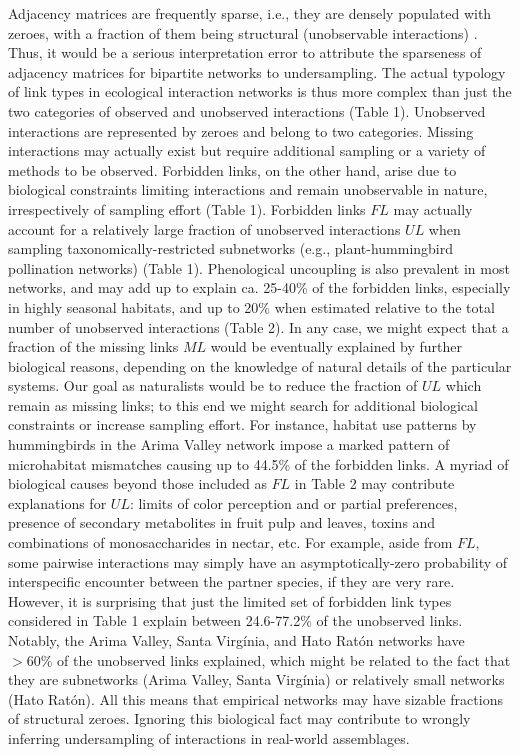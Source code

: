 \documentclass[12pt]{article}
\begin{document}
Adjacency matrices are frequently sparse, i.e., they are densely populated with zeroes, with a fraction of them being structural (unobservable interactions) \citep{Bascompte:2014to}. Thus, it would be a serious interpretation error to attribute the sparseness of adjacency matrices for bipartite networks to undersampling. The actual typology of link types in ecological interaction networks is thus more complex than just the two categories of observed and unobserved interactions (Table 1). Unobserved interactions are represented by zeroes and belong to two categories. Missing interactions may actually exist but require additional sampling or a variety of methods to be observed. Forbidden links, on the other hand, arise due to biological constraints limiting interactions and remain unobservable in nature, irrespectively of sampling effort (Table 1). Forbidden links $FL$ may actually account for a relatively large fraction of unobserved interactions $UL$ when sampling taxonomically-restricted subnetworks (e.g., plant-hummingbird pollination networks) (Table 1). Phenological uncoupling is also prevalent in most networks, and may add up to explain ca. 25-40\% of the forbidden links, especially in highly seasonal habitats, and up to 20\% when estimated relative to the total number of unobserved interactions (Table 2). In any case, we might expect that a fraction of the missing links $ML$ would be eventually explained by further biological reasons, depending on the knowledge of natural details of the particular systems. Our goal as naturalists would be to reduce the fraction of $UL$ which remain as missing links; to this end we might search for additional biological constraints or increase sampling effort. For instance, habitat use patterns by hummingbirds in the Arima Valley network \citep[Table 2; ][]{E31.616} impose a marked pattern of microhabitat mismatches causing up to 44.5\% of the forbidden links. A myriad of biological causes beyond those included as $FL$ in Table 2 may contribute explanations for $UL$: limits of color perception and or partial preferences, presence of secondary metabolites in fruit pulp and leaves, toxins and combinations of monosaccharides in nectar, etc. For example, aside from $FL$, some pairwise interactions may simply have an asymptotically-zero probability of interspecific encounter between the partner species, if they are very rare. However, it is surprising that just the limited set of forbidden link types considered in Table 1 explain between 24.6-77.2\% of the unobserved links. Notably, the Arima Valley, Santa Virg\'inia, and Hato Rat\'on networks have $>60\%$ of the unobserved links explained, which might be related to the fact that they are subnetworks (Arima Valley, Santa Virg\'inia) or relatively small networks (Hato Rat\'on). All this means that empirical networks may have sizable fractions of structural zeroes. Ignoring this biological fact may contribute to wrongly inferring undersampling of interactions in real-world assemblages.
\end{document}
